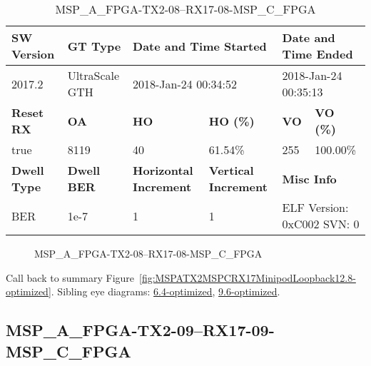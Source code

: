 \begin{table}[h]
\centering
\caption{MSP\_A\_FPGA-TX2-08--RX17-08-MSP\_C\_FPGA}
\label{tab:MSPAFPGATX208RX1708MSPCFPGA12.8-optimized}
\begin{tabular}{@{}|l|l|l|l|l|l|@{}}
\toprule
\textbf{SW Version}                & \textbf{GT Type}   & \multicolumn{2}{l|}{\textbf{Date and Time Started}}            & \multicolumn{2}{l|}{\textbf{Date and Time Ended}}        \\ \midrule
2017.2                       & UltraScale GTH          & \multicolumn{2}{l|}{2018-Jan-24 00:34:52}                   & \multicolumn{2}{l|}{2018-Jan-24 00:35:13}               \\ \midrule
\textbf{Reset RX}                  & \textbf{OA} & \textbf{HO}   & \textbf{HO (\%)} & \textbf{VO} & \textbf{VO (\%)} \\ \midrule
true & 8119        & 40          & 61.54\%        & 255        & 100.00\%       \\ \midrule
\textbf{Dwell Type}                & \textbf{Dwell BER} & \textbf{Horizontal Increment} & \textbf{Vertical Increment}    & \multicolumn{2}{l|}{\textbf{Misc Info}}                  \\ \midrule
BER                            & 1e-7        & 1        & 1           & \multicolumn{2}{l|}{ELF Version: 0xC002 SVN: 0}                         \\ \bottomrule
\end{tabular}
\end{table}

\begin{figure}[h]
\caption{MSP\_A\_FPGA-TX2-08--RX17-08-MSP\_C\_FPGA} \label{fig:MSPAFPGATX208RX1708MSPCFPGA12.8-optimized}
\end{figure}

Call back to summary Figure~\ref{fig:MSPATX2MSPCRX17MinipodLoopback12.8-optimized}.
Sibling eye diagrams: \hyperref[sec:MSPAFPGATX208RX1708MSPCFPGA6.4-optimized]{6.4-optimized}, \hyperref[sec:MSPAFPGATX208RX1708MSPCFPGA9.6-optimized]{9.6-optimized}.

\clearpage
\newpage


\subsection{MSP\_A\_FPGA-TX2-09--RX17-09-MSP\_C\_FPGA}\label{sec:MSPAFPGATX209RX1709MSPCFPGA12.8-optimized}

